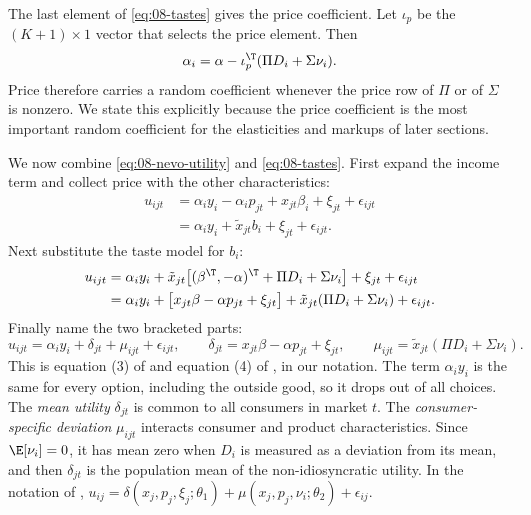 The last element of \eqref{eq:08-tastes} gives the price coefficient. Let $\iota_p$ be the $(K+1) \times 1$ vector
that selects the price element. Then
\begin{equation}\label{eq:08-alpha-i}
  \alpha_i = \alpha - \iota_p^\T(\Pi D_i + \Sigma \nu_i).
\end{equation}
Price therefore carries a random coefficient whenever the price row of $\Pi$ or of $\Sigma$ is nonzero. We
state this explicitly because the price coefficient is the most important random coefficient for the
elasticities and markups of later sections.

We now combine \eqref{eq:08-nevo-utility} and \eqref{eq:08-tastes}. First expand the income term and
collect price with the other characteristics:
\begin{align*}
  u_{ijt} &= \alpha_i y_i - \alpha_i p_{jt} + x_{jt}\beta_i + \xi_{jt} + \epsilon_{ijt} \\
          &= \alpha_i y_i + \tilde x_{jt} b_i + \xi_{jt} + \epsilon_{ijt}.
\end{align*}
Next substitute the taste model for $b_i$:
\begin{align*}
  u_{ijt} &= \alpha_i y_i + \tilde x_{jt}\bigl[(\beta^\T, -\alpha)^\T + \Pi D_i + \Sigma\nu_i\bigr]
             + \xi_{jt} + \epsilon_{ijt} \\
          &= \alpha_i y_i + \bigl[x_{jt}\beta - \alpha p_{jt} + \xi_{jt}\bigr]
             + \tilde x_{jt}(\Pi D_i + \Sigma\nu_i) + \epsilon_{ijt}.
\end{align*}
Finally name the two bracketed parts:
\begin{equation}\label{eq:08-decomposition}
  u_{ijt} = \alpha_i y_i + \delta_{jt} + \mu_{ijt} + \epsilon_{ijt}, \qquad
  \delta_{jt} = x_{jt}\beta - \alpha p_{jt} + \xi_{jt}, \qquad
  \mu_{ijt} = \tilde x_{jt}(\Pi D_i + \Sigma \nu_i).
\end{equation}
This is equation (3) of \citet{Nevo2000a} and equation (4) of \citet{Nevo2001}, in our notation. The term
$\alpha_i y_i$ is the same for every option, including the outside good, so it drops out of all choices. The
\emph{mean utility} $\delta_{jt}$ is common to all consumers in market $t$. The \emph{consumer-specific
deviation} $\mu_{ijt}$ interacts consumer and product characteristics. Since $\E[\nu_i] = 0$, it has mean zero
when $D_i$ is measured as a deviation from its mean, and then $\delta_{jt}$ is the population mean of the
non-idiosyncratic utility. In the notation of \citet[eq.~(6.1)]{BerryLevinsohnPakes1995},
$u_{ij} = \delta(x_j, p_j, \xi_j; \theta_1) + \mu(x_j, p_j, \nu_i; \theta_2) + \epsilon_{ij}$.

